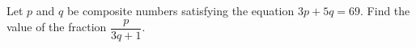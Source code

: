 Let $p$ and $q$ be composite numbers satisfying the equation $3p+5q=69$. Find the value of the fraction $\dfrac{p}{3q+1}$.
